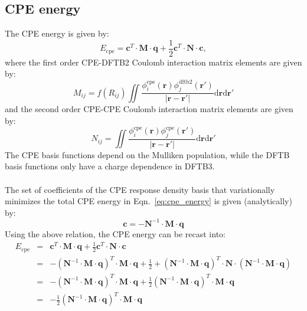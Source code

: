 \documentclass{article}
\numberwithin{equation}{section}
\begin{document}
\subsection{CPE energy}
The CPE energy is given by:\cite{cpekaminski}
\begin{equation}
    E_{\mathrm{cpe}} = \mathbf{c}^T \cdot \mathbf{M} \cdot \mathbf{q} + \frac{1}{2} \mathbf{c}^T \cdot \mathbf{N} \cdot \mathbf{c},\label{eq:cpe_energy}
\end{equation}
where the first order CPE-DFTB2 Coulomb interaction matrix elements are given by:
\begin{equation}
    M_{ij} = f(R_{ij})\iint \frac{\phi_i^\mathrm{cpe}\left(\mathbf{r}\right)\phi_j^\mathrm{dftb2}\left(\mathbf{r'}\right)}{\left| \mathbf{r} - \mathbf{r'}\right|} \mathrm{d}\mathbf{r}\mathrm{d}\mathbf{r'}
\end{equation}
and the second order CPE-CPE Coulomb interaction matrix elements are given by:
\begin{equation}
    N_{ij} = \iint \frac{\phi_i^\mathrm{cpe}\left(\mathbf{r}\right)\phi_j^\mathrm{cpe}\left(\mathbf{r'}\right)}{\left| \mathbf{r} - \mathbf{r'}\right|} \mathrm{d}\mathbf{r}\mathrm{d}\mathbf{r'}
\end{equation}
The CPE basis functions depend on the Mulliken population, while the DFTB basis functions only have a charge dependence in DFTB3.
\\\\The set of coefficients of the CPE response density basis that variationally minimizes the total CPE energy in Eqn.~\ref{eq:cpe_energy} is given (analytically) by:
\begin{equation}
    \mathbf{c}= -\mathbf{N}^{-1} \cdot \mathbf{M} \cdot \mathbf{q}
\end{equation}
Using the above relation, the CPE energy can be recast into:
\begin{eqnarray}
    E_{\mathrm{cpe}}
    &=& \mathbf{c}^T \cdot \mathbf{M} \cdot \mathbf{q} + \frac{1}{2} \mathbf{c}^T \cdot \mathbf{N} \cdot \mathbf{c} \\
    &=& -(\mathbf{N}^{-1} \cdot \mathbf{M} \cdot \mathbf{q})^T \cdot \mathbf{M} \cdot \mathbf{q} + \frac{1}{2} + (\mathbf{N}^{-1} \cdot \mathbf{M} \cdot \mathbf{q})^T \cdot \mathbf{N} \cdot (\mathbf{N}^{-1} \cdot \mathbf{M} \cdot \mathbf{q})\\
    &=& -(\mathbf{N}^{-1} \cdot \mathbf{M} \cdot \mathbf{q})^T \cdot \mathbf{M} \cdot \mathbf{q} + \frac{1}{2} (\mathbf{N}^{-1} \cdot \mathbf{M} \cdot \mathbf{q})^T  \cdot \mathbf{M} \cdot \mathbf{q}\\
    &=& -\frac{1}{2} (\mathbf{N}^{-1} \cdot \mathbf{M} \cdot \mathbf{q})^T  \cdot \mathbf{M} \cdot \mathbf{q}
\end{eqnarray}
\end{document}
